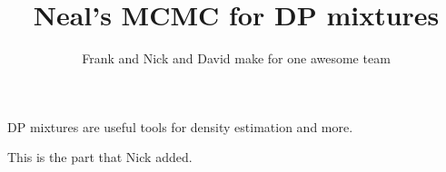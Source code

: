 \documentclass[11pt]{amsart}
\title{Neal's MCMC for DP mixtures}
\author{Frank and Nick and David make for one awesome team}
\begin{document}
\maketitle

DP mixtures are useful tools for density estimation and more.



This is the part that Nick added.
\end{document}
